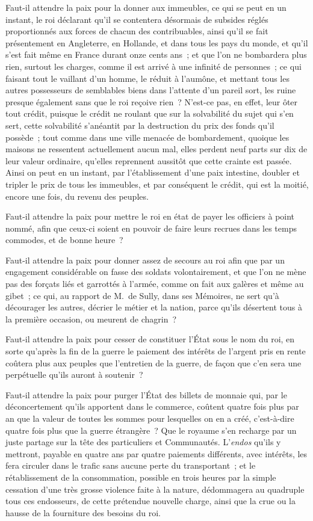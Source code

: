 \documentclass[french,twoside]{book} %
\begin{document}
Faut-il attendre la paix pour la donner aux immeubles, ce qui se peut en un instant, le roi déclarant qu’il se contentera désormais de subsides réglés proportionnés aux forces de chacun des contribuables, ainsi qu’il se fait présentement en Angleterre, en Hollande, et dans tous les pays du monde, et qu’il s’est fait même en France durant onze cents ans ; et que l’on ne bombardera plus rien, surtout les charges, comme il est arrivé à une infinité de personnes ; ce qui faisant tout le vaillant d’un homme, le réduit à l’aumône, et mettant tous les autres possesseurs de semblables biens dans l’attente d’un pareil sort, les ruine presque également sans que le roi reçoive rien ? N’est-ce pas, en effet, leur ôter tout crédit, puisque le crédit ne roulant que sur la solvabilité du sujet qui s’en sert, cette solvabilité s’anéantit par la destruction du prix des fonds qu’il possède ; tout comme dans une ville menacée de bombardement, quoique les maisons ne ressentent actuellement aucun mal, elles perdent neuf parts sur dix de leur valeur ordinaire, qu’elles reprennent aussitôt que cette crainte est passée. Ainsi on peut en un instant, par l’établissement d’une paix intestine, doubler et tripler le prix de tous les immeubles, et par conséquent le crédit, qui est la moitié, encore une fois, du revenu des peuples.\par
Faut-il attendre la paix pour mettre le roi en état de payer les officiers à point nommé, afin que ceux-ci soient en pouvoir de faire leurs recrues dans les temps commodes, et de bonne heure ?\par
Faut-il attendre la paix pour donner assez de secours au roi afin que par un engagement considérable on fasse des soldats volontairement, et que l’on ne mène pas des forçats liés et garrottés à l’armée, comme on fait aux galères et même au gibet ; ce qui, au rapport de M. de Sully, dans ses Mémoires, ne sert qu’à décourager les autres, décrier le métier et la nation, parce qu’ils désertent tous à la première occasion, ou meurent de chagrin ?\par
Faut-il attendre la paix pour cesser de constituer l’État sous le nom du roi, en sorte qu’après la fin de la guerre le paiement des intérêts de l’argent pris en rente coûtera plus aux peuples que l’entretien de la guerre, de façon que c’en sera une perpétuelle qu’ils auront à soutenir ?\par
Faut-il attendre la paix pour purger l’État des billets de monnaie qui, par le déconcertement qu’ils apportent dans le commerce, coûtent quatre fois plus par an que la valeur de toutes les sommes pour lesquelles on en a créé, c’est-à-dire quatre fois plus que la guerre étrangère ? Que le royaume s’en recharge par un juste partage sur la tête des particuliers et Communautés. L’{\itshape endos} qu’ils y mettront, payable en quatre ans par quatre paiements différents, avec intérêts, les fera circuler dans le trafic sans aucune perte du transportant ; et le rétablissement de la consommation, possible en trois heures par la simple cessation d’une très grosse violence faite à la nature, dédommagera au quadruple tous ces endosseurs, de cette prétendue nouvelle charge, ainsi que la crue ou la hausse de la fourniture des besoins du roi.\par
\end{document}
